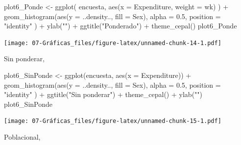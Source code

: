 \documentclass[
  12pt,
]{book}
\newenvironment{Shaded}{\begin{snugshade}}{\end{snugshade}}
\newcommand{\AttributeTok}[1]{\textcolor[rgb]{0.77,0.63,0.00}{#1}}
\newcommand{\FloatTok}[1]{\textcolor[rgb]{0.00,0.00,0.81}{#1}}
\newcommand{\FunctionTok}[1]{\textcolor[rgb]{0.00,0.00,0.00}{#1}}
\newcommand{\NormalTok}[1]{#1}
\newcommand{\OtherTok}[1]{\textcolor[rgb]{0.56,0.35,0.01}{#1}}
\newcommand{\SpecialCharTok}[1]{\textcolor[rgb]{0.00,0.00,0.00}{#1}}
\newcommand{\StringTok}[1]{\textcolor[rgb]{0.31,0.60,0.02}{#1}}
\begin{document}
\begin{Shaded}
\begin{Highlighting}[]
\NormalTok{plot6\_Ponde }\OtherTok{\textless{}{-}} \FunctionTok{ggplot}\NormalTok{(}
\NormalTok{  encuesta,}
  \FunctionTok{aes}\NormalTok{(}\AttributeTok{x =}\NormalTok{ Expenditure, }\AttributeTok{weight =}\NormalTok{ wk)}
\NormalTok{) }\SpecialCharTok{+}
  \FunctionTok{geom\_histogram}\NormalTok{(}\FunctionTok{aes}\NormalTok{(}\AttributeTok{y =}\NormalTok{ ..density.., }\AttributeTok{fill =}\NormalTok{ Sex),}
    \AttributeTok{alpha =} \FloatTok{0.5}\NormalTok{, }\AttributeTok{position =} \StringTok{"identity"}
\NormalTok{  ) }\SpecialCharTok{+}
  \FunctionTok{ylab}\NormalTok{(}\StringTok{""}\NormalTok{) }\SpecialCharTok{+}
  \FunctionTok{ggtitle}\NormalTok{(}\StringTok{"Ponderado"}\NormalTok{) }\SpecialCharTok{+}
  \FunctionTok{theme\_cepal}\NormalTok{()}
\NormalTok{plot6\_Ponde}
\end{Highlighting}
\end{Shaded}

\texttt{[image: 07-Gráficas\_files/figure-latex/unnamed-chunk-14-1.pdf]}

Sin ponderar,

\begin{Shaded}
\begin{Highlighting}[]
\NormalTok{plot6\_SinPonde }\OtherTok{\textless{}{-}} \FunctionTok{ggplot}\NormalTok{(encuesta, }\FunctionTok{aes}\NormalTok{(}\AttributeTok{x =}\NormalTok{ Expenditure)) }\SpecialCharTok{+}
  \FunctionTok{geom\_histogram}\NormalTok{(}\FunctionTok{aes}\NormalTok{(}\AttributeTok{y =}\NormalTok{ ..density.., }\AttributeTok{fill =}\NormalTok{ Sex),}
    \AttributeTok{alpha =} \FloatTok{0.5}\NormalTok{, }\AttributeTok{position =} \StringTok{"identity"}
\NormalTok{  ) }\SpecialCharTok{+}
  \FunctionTok{ggtitle}\NormalTok{(}\StringTok{"Sin ponderar"}\NormalTok{) }\SpecialCharTok{+}
  \FunctionTok{theme\_cepal}\NormalTok{() }\SpecialCharTok{+}
  \FunctionTok{ylab}\NormalTok{(}\StringTok{""}\NormalTok{)}
\NormalTok{plot6\_SinPonde}
\end{Highlighting}
\end{Shaded}

\texttt{[image: 07-Gráficas\_files/figure-latex/unnamed-chunk-15-1.pdf]}

Poblacional,
\end{document}
